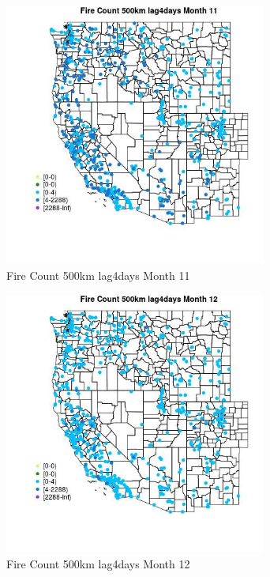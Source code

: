 \begin{figure} 
\centering  
\includegraphics[width=0.77\textwidth]{Code_Outputs/Report_ML_input_PM25_Step4_part_e_de_duplicated_aves_compiled_2019-05-21wNAs_MapObsMo11Fire_Count_500km_lag4days.jpg} 
\caption{\label{fig:Report_ML_input_PM25_Step4_part_e_de_duplicated_aves_compiled_2019-05-21wNAsMapObsMo11Fire_Count_500km_lag4days}Fire Count 500km lag4days Month 11} 
\end{figure} 
 

\begin{figure} 
\centering  
\includegraphics[width=0.77\textwidth]{Code_Outputs/Report_ML_input_PM25_Step4_part_e_de_duplicated_aves_compiled_2019-05-21wNAs_MapObsMo12Fire_Count_500km_lag4days.jpg} 
\caption{\label{fig:Report_ML_input_PM25_Step4_part_e_de_duplicated_aves_compiled_2019-05-21wNAsMapObsMo12Fire_Count_500km_lag4days}Fire Count 500km lag4days Month 12} 
\end{figure} 
 

